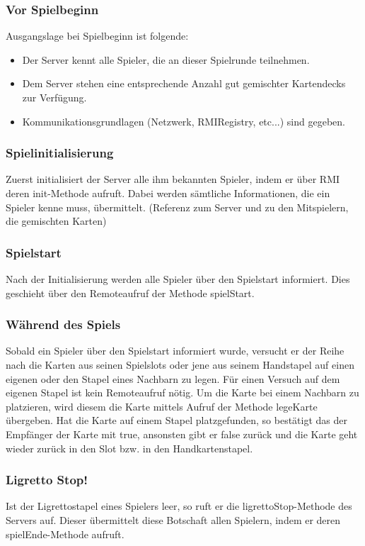 \subsubsection{Vor Spielbeginn}

Ausgangslage bei Spielbeginn ist folgende:
\begin{itemize}
\item Der Server kennt alle Spieler, die an dieser Spielrunde teilnehmen.
\item Dem Server stehen eine entsprechende Anzahl gut gemischter Kartendecks zur Verfügung.
\item Kommunikationsgrundlagen (Netzwerk, RMIRegistry, etc...) sind gegeben.
\end{itemize}

\subsubsection{Spielinitialisierung}
Zuerst initialisiert der Server alle ihm bekannten Spieler, indem er über RMI deren init-Methode aufruft. Dabei werden sämtliche Informationen, die ein Spieler kenne muss, übermittelt. (Referenz zum Server und zu den Mitspielern, die gemischten Karten)

\subsubsection{Spielstart}
Nach der Initialisierung werden alle Spieler über den Spielstart informiert. Dies geschieht über den Remoteaufruf der Methode spielStart.

\subsubsection{Während des Spiels}
Sobald ein Spieler über den Spielstart informiert wurde, versucht er der Reihe nach die Karten aus seinen Spielslots oder jene aus seinem Handstapel auf einen eigenen oder den Stapel eines Nachbarn zu legen. Für einen Versuch auf dem eigenen Stapel ist kein Remoteaufruf nötig. Um die Karte bei einem Nachbarn zu platzieren, wird diesem die Karte mittels Aufruf der Methode legeKarte übergeben. Hat die Karte auf einem Stapel platzgefunden, so bestätigt das der Empfänger der Karte mit true, ansonsten gibt er false zurück und die Karte geht wieder zurück in den Slot bzw. in den Handkartenstapel.

\subsubsection{Ligretto Stop!}
Ist der Ligrettostapel eines Spielers leer, so ruft er die ligrettoStop-Methode des Servers auf. Dieser übermittelt diese Botschaft allen Spielern, indem er deren spielEnde-Methode aufruft.

